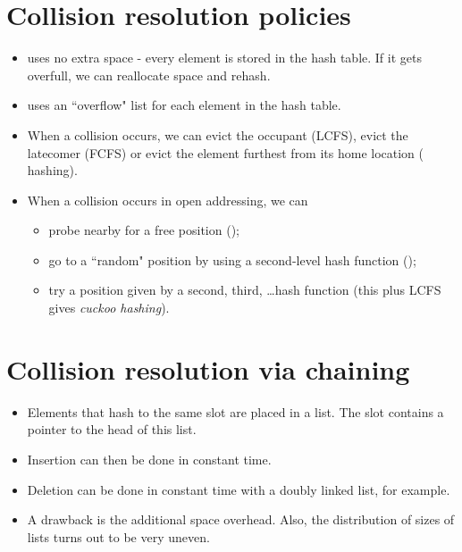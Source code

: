 \section*{Collision resolution policies}
\begin{itemize}
\item {} uses no extra space - every element is stored in 
the hash table. If it gets overfull, we can reallocate space and 
{rehash}.
\item  {} uses an ``overflow" list for each element in 
the hash table.
\item When a collision occurs, we can evict the occupant (LCFS), 
evict the latecomer (FCFS) or evict the element furthest from its home location
 ( hashing).
\item When a collision occurs in open addressing, we can 
	\begin{itemize}
		\item probe nearby for a free position 
		();
		\item go to a ``random" position by using a second-level hash function 
		();
		\item try a position given by a second, third, \dots hash function (this plus 
		LCFS gives \emph{cuckoo hashing}). 
	\end{itemize}
\end{itemize}



\section*{Collision resolution via chaining}
\begin{itemize}
\item Elements that hash to the same slot are placed in a list. The slot
contains a pointer to the head of this list. 
\item Insertion can then be done in constant time. 
\item Deletion can be done in constant time with a doubly linked list, for 
example. 
\item A drawback is the additional space overhead. Also, the distribution of 
sizes of lists turns out to be very uneven.
\end{itemize}

